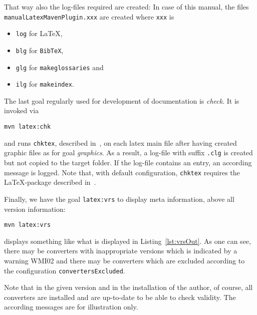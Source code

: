 
That way also the log-files required are created: 
In case of this manual, 
the files \texttt{manualLatexMavenPlugin.xxx} are created 
where \texttt{xxx} is 
%
\begin{itemize}
\item
\texttt{log} for \LaTeX, 
\item
\texttt{blg} for \texttt{BibTeX}, 
\item
\texttt{glg} for \texttt{makeglossaries} and 
\item
\texttt{ilg} for \texttt{makeindex}. 
\end{itemize}

The last goal regularly used for development of documentation is {\em check}. 
It is invoked via 
% 
\begin{Verbatim}
mvn latex:chk
\end{Verbatim}
%
and runs \texttt{chktex}, described in~\cite{ChkTeX}, 
on each latex main file 
after having created graphic files as for goal {\em graphics}. 
As a result, a log-file with suffix \texttt{.clg} is created 
but not copied to the target folder. 
If the log-file contains an entry, 
an according message is logged. 
Note that, with default configuration, 
\texttt{chktex} requires the \LaTeX-package  
described in~\cite{BooktP}. 


Finally, we have the goal \texttt{latex:vrs}
to display meta information, above all version information:
% 
\begin{Verbatim}
mvn latex:vrs
\end{Verbatim}
%
displays something like what is displayed in Listing~\ref{lst:vrsOut}.
As one can see, there may be converters with inappropriate versions
which is indicated by a warning WMI02 
and there may be converters which are excluded
according to the configuration \texttt{convertersExcluded}.

Note that in the given version and in the installation of the author,
of course, all converters are installed and are up-to-date
to be able to check validity.
The according messages are for illustration only. 


